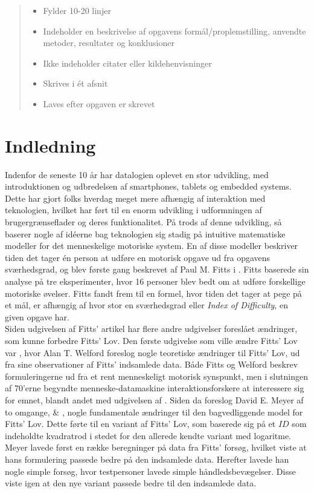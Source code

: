 

\begin{abstract}
\begin{itemize}
	\item Fylder 10-20 linjer
	\item Indeholder en beskrivelse af opgavens formål/proplemstilling, anvendte metoder, resultater og konklusioner
	\item Ikke indeholder citater eller kildehenvisninger
	\item Skrives i ét afsnit
	\item Laves efter opgaven er skrevet
\end{itemize}
\end{abstract}

\chapter*{Indledning}
Indenfor de seneste 10 år har datalogien oplevet en stor udvikling, med introduktionen og udbredelsen af smartphones, tablets og embedded systems. Dette har gjort folks hverdag meget mere afhængig af interaktion med teknologien, hvilket har ført til en enorm udvikling i udformningen af brugergrænseflader og deres funktionalitet. På trods af denne udvikling, så baserer nogle af idéerne bag teknologien sig stadig på intuitive matematiske modeller for det menneskelige motoriske system. En af disse modeller beskriver tiden det tager én person at udføre en motorisk opgave ud fra opgavens sværhedsgrad, og blev første gang beskrevet af Paul M. Fitts i \cite{fitts1954}. Fitts baserede sin analyse på tre eksperimenter, hvor 16 personer blev bedt om at udføre forskellige motoriske øvelser. Fitts fandt frem til en formel, hvor tiden det tager at pege på et mål, er afhængig af hvor stor en sværhedsgrad eller \textit{Index of Difficulty}, en given opgave har.\\

Siden udgivelsen af Fitts' artikel har flere andre udgivelser foreslået ændringer, som kunne forbedre Fitts' Lov. Den første udgivelse som ville ændre Fitts' Lov var \cite{welford1968}, hvor Alan T. Welford foreslog nogle teoretiske ændringer til Fitts' Lov, ud fra sine observationer af Fitts' indsamlede data. Både Fitts og Welford beskrev formuleringerne ud fra et rent menneskeligt motorisk synspunkt, men i slutningen af 70'erne begyndte menneske-datamaskine interaktionsforskere at interessere sig for emnet, blandt andet med udgivelsen af \cite{card1978}. Siden da foreslog David E. Meyer af to omgange, \cite{meyer1988} \& \cite{meyer1990}, nogle fundamentale ændringer til den bagvedliggende model for Fitts' Lov. Dette førte til en variant af Fitts' Lov, som baserede sig på et $ID$ som indeholdte kvadratrod i stedet for den allerede kendte variant med logaritme. Meyer lavede først en række beregninger på data fra Fitts' forsøg, hvilket viste at hans formulering passede bedre på den indsamlede data. Herefter lavede han nogle simple forsøg, hvor testpersoner lavede simple håndledsbevægelser. Disse viste igen at den nye variant passede bedre til den indsamlede data.\\

